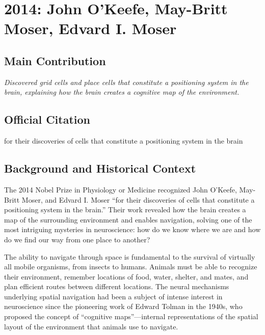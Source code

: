 \chapter[2014 --- O'Keefe et al.]{2014: John O'Keefe, May-Britt Moser, Edvard I. Moser}
\label{ch:2014_OKeefe}

\section*{Main Contribution}

\textit{Discovered grid cells and place cells that constitute a positioning system in the brain, explaining how the brain creates a cognitive map of the environment.}\cite{nobel-2014,lecture-2014}

\section{Official Citation}

for their discoveries of cells that constitute a positioning system in the brain

\section{Background and Historical Context}

The 2014 Nobel Prize in Physiology or Medicine recognized John O'Keefe, May-Britt Moser, and Edvard I. Moser ``for their discoveries of cells that constitute a positioning system in the brain.'' Their work revealed how the brain creates a map of the surrounding environment and enables navigation, solving one of the most intriguing mysteries in neuroscience: how do we know where we are and how do we find our way from one place to another?

The ability to navigate through space is fundamental to the survival of virtually all mobile organisms, from insects to humans. Animals must be able to recognize their environment, remember locations of food, water, shelter, and mates, and plan efficient routes between different locations. The neural mechanisms underlying spatial navigation had been a subject of intense interest in neuroscience since the pioneering work of Edward Tolman in the 1940s, who proposed the concept of ``cognitive maps''---internal representations of the spatial layout of the environment that animals use to navigate.


